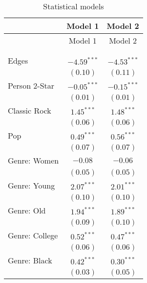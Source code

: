 
\begin{center}
\begin{longtable}{l c c}
\toprule
 & Model 1 & Model 2 \\
\midrule
\endfirsthead
\toprule
 & Model 1 & Model 2 \\
\midrule
\endhead
\bottomrule
\endfoot
\bottomrule
\multicolumn{3}{l}{\scriptsize{$^{***}p<0.001$; $^{**}p<0.01$; $^{*}p<0.05$}}\\
\caption{Statistical models}
\label{table:coefficients}
\endlastfoot \\
Edges                                  & $-4.59^{***}$ & $-4.53^{***}$ \\
                                       & $(0.10)$      & $(0.11)$      \\
Person 2-Star                          & $-0.05^{***}$ & $-0.15^{***}$ \\
                                       & $(0.01)$      & $(0.01)$      \\
Classic Rock                           & $1.45^{***}$  & $1.48^{***}$  \\
                                       & $(0.06)$      & $(0.06)$      \\
Pop                                    & $0.49^{***}$  & $0.56^{***}$  \\
                                       & $(0.07)$      & $(0.07)$      \\
Genre: Women                           & $-0.08$       & $-0.06$       \\
                                       & $(0.05)$      & $(0.05)$      \\
Genre: Young                           & $2.07^{***}$  & $2.01^{***}$  \\
                                       & $(0.10)$      & $(0.10)$      \\
Genre: Old                             & $1.94^{***}$  & $1.89^{***}$  \\
                                       & $(0.09)$      & $(0.10)$      \\
Genre: College                         & $0.52^{***}$  & $0.47^{***}$  \\
                                       & $(0.06)$      & $(0.06)$      \\
Genre: Black                           & $0.42^{***}$  & $0.30^{***}$  \\
                                       & $(0.03)$      & $(0.05)$      \\

\end{longtable}
\end{center}
